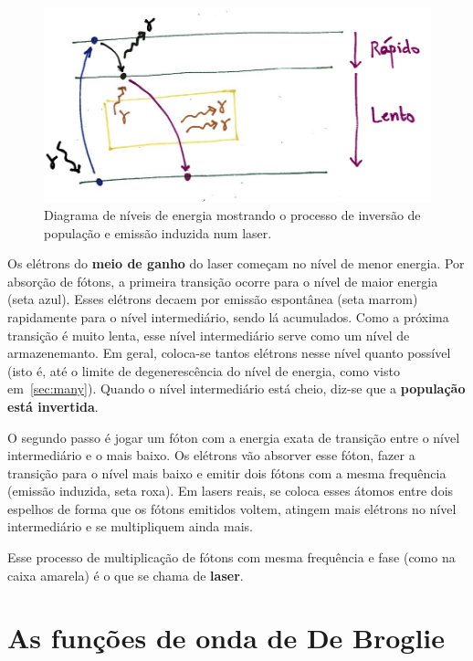 \documentclass{article}
\begin{document}
\begin{figure}[ht]
\begin{center}
\includegraphics[width=\textwidth]{laser.png}
\caption{\label{fig:laser}Diagrama de n\'iveis de energia mostrando o processo de invers\~ao de popula\c c\~ao e emiss\~ao induzida num laser.}
\end{center}
\end{figure}
Os el\'etrons do \textbf{meio de ganho} do laser come\c cam no n\'ivel de menor energia. Por absor\c c\~ao de f\'otons, a primeira transi\c c\~ao ocorre para o n\'ivel de maior energia (seta azul). Esses el\'etrons decaem por emiss\~ao espont\^anea (seta marrom) rapidamente para o n\'ivel intermedi\'ario, sendo l\'a acumulados. Como a pr\'oxima transi\c c\~ao \'e muito lenta, esse n\'ivel intermedi\'ario serve como um n\'ivel de armazenemanto. Em geral, coloca-se tantos el\'etrons nesse n\'ivel quanto poss\'ivel (isto \'e, at\'e o limite de degeneresc\^encia do n\'ivel de energia, como visto em~\ref{sec:many}). Quando o n\'ivel intermedi\'ario est\'a cheio, diz-se que a \textbf{popula\c c\~ao est\'a invertida}.

O segundo passo \'e jogar um f\'oton com a energia exata de transi\c c\~ao entre o n\'ivel intermedi\'ario e o mais baixo. Os el\'etrons v\~ao absorver esse f\'oton, fazer a transi\c c\~ao para o n\'ivel mais baixo e emitir dois f\'otons com a mesma frequ\^encia (emiss\~ao induzida, seta roxa). Em lasers reais, se coloca esses \'atomos entre dois espelhos de forma que os f\'otons emitidos voltem, atingem mais el\'etrons no n\'ivel intermedi\'ario e se multipliquem ainda mais.

Esse processo de multiplica\c c\~ao de f\'otons com mesma frequ\^encia e fase (como na caixa amarela) \'e o que se chama de \textbf{laser}.

\section{As fun\c c\~oes de onda de De Broglie}
\end{document}
